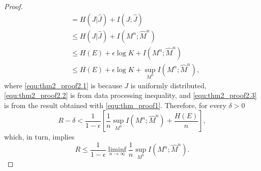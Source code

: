 \documentclass[10pt,a4paper]{amsart}
\begin{document}
\begin{proof}
\begin{subequations}
\begin{align}
            & = H(J|\hat{J}) + I(J;\hat{J}) \\
            & \leq H(J|\hat{J}) + I(M^n;\hat{M}^n) \label{equ:thm2_proof2.2} \\
            & \leq H(E) + \epsilon\log K + I(M^n;\hat{M}^n) \label{equ:thm2_proof2.3} \\
            & \leq H(E) + \epsilon\log K + \sup_{M^n}I(M^n;\hat{M}^n) \label{equ:thm2_proof2.4},
        \end{align}
    \end{subequations}
    where \cref{equ:thm2_proof2.1} is because $J$ is uniformly distributed, \cref{equ:thm2_proof2.2} is from data processing inequality, and \cref{equ:thm2_proof2.3} is from the result obtained with \cref{equ:thm_proof1}. 
    Therefore, for every $\delta>0$
    \begin{equation}
        R-\delta < \frac{1}{1-\epsilon}\left[\frac{1}{n}\sup_{M^n}I(M^n;\hat{M}^n) + \frac{H(E)}{n}\right],
    \end{equation}
    which, in turn, implies
    \begin{equation}
        R\leq \frac{1}{1-\epsilon} \liminf_{n\to\infty}\frac{1}{n}\sup_{M^n}I(M^n;\hat{M}^n).
    \end{equation}
\end{proof}
\end{document}
